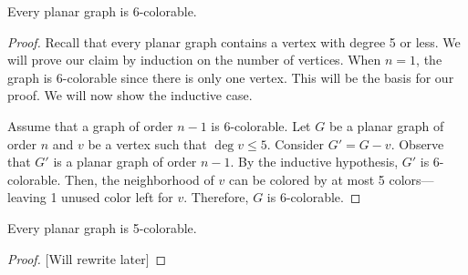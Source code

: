 \begin{theorem}
  Every planar graph is \(6\)-colorable.
\end{theorem}

\begin{proof}
  Recall that every planar graph contains a vertex with degree 5
  or less. We will prove our claim by induction on the number of
  vertices. When \(n=1\), the graph is 6-colorable since there is
  only one vertex. This will be the basis for our proof.
  We will now show the inductive case. 

  Assume that a graph of order \(n-1\) is 6-colorable. Let \(G\)
  be a planar graph of order \(n\) and \(v\) be a vertex such that
  \(\deg v \leq 5\). Consider \(G' = G-v\). Observe that \(G'\)
  is a planar graph of order \(n-1\). By the inductive hypothesis,
  \(G'\) is 6-colorable. Then, the neighborhood of \(v\) can be
  colored by at most 5 colors---leaving 1 unused color left for
  \(v\). Therefore, \(G\) is 6-colorable.   
\end{proof}

\begin{theorem}
  Every planar graph is 5-colorable.
\end{theorem}

\begin{proof}


  [Will rewrite later]
\end{proof}

